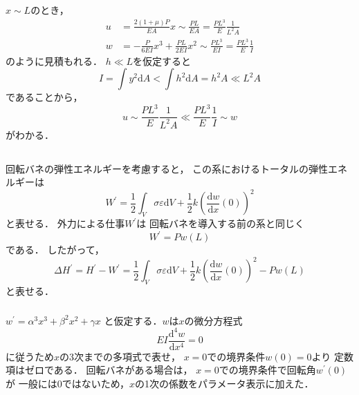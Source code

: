 \documentclass[a4paper]{jsarticle}
\begin{document}
\subsubsection{}
$x \sim L$のとき，
\begin{align}
  u & = \frac{2 (1 + \mu)P}{EA} x  \sim \frac{PL}{EA} =
  \frac{PL^3}{E} \frac{1}{L^2 A}                                               \\
  w & = -\frac{P}{6 E I} x^3 + \frac{P L}{2 E I} x^2  \sim \frac{P L^3}{E I} =
  \frac{P L^3}{E} \frac{1}{I}
\end{align}
のように見積もれる．
$h \ll L$を仮定すると
\begin{equation}
  I = \int y^2 \mathrm{d} A < \int h^2 \mathrm{d} A = h^2 A \ll L^2 A
\end{equation}
であることから，
\begin{equation}
  u \sim \frac{P L^3}{E} \frac{1}{L^2 A} \ll \frac{P L^3}{E} \frac{1}{I} \sim w
\end{equation}
がわかる．

\subsection{}
\subsubsection{}
回転バネの弾性エネルギーを考慮すると，
この系におけるトータルの弾性エネルギーは
\begin{equation}
  W^{\prime} = \frac{1}{2}\int_V \sigma \varepsilon \mathrm{d} V
  + \frac{1}{2} k \left(\frac{\mathrm{d} w}{\mathrm{d} x}(0)\right)^2
\end{equation}
と表せる．
外力による仕事$W^{\prime}$は
回転バネを導入する前の系と同じく
\begin{equation}
  W^{\prime} = P w(L)
\end{equation}
である．
したがって，
\begin{equation}
  \Delta H^{\prime} = H^{\prime} - W^{\prime} =
  \frac{1}{2}\int_V \sigma \varepsilon \mathrm{d} V
  + \frac{1}{2} k \left(\frac{\mathrm{d} w}{\mathrm{d} x}(0)\right)^2
  - P w(L)
\end{equation}
と表せる．

\subsubsection{}
$w^{\prime} = \alpha^3 x^3 + \beta^2 x^2 + \gamma x$
と仮定する．$w$は$x$の微分方程式
\begin{equation}
  E I \frac{\mathrm{d}^4 w}{\mathrm{d} x^4} = 0
\end{equation}
に従うため$x$の3次までの多項式で表せ，
$x = 0$での境界条件$w(0) = 0$より
定数項はゼロである．
回転バネがある場合は，
$x = 0$での境界条件で回転角$w^{\prime}(0)$が
一般には0ではないため，$x$の1次の係数をパラメータ表示に加えた．
\end{document}
